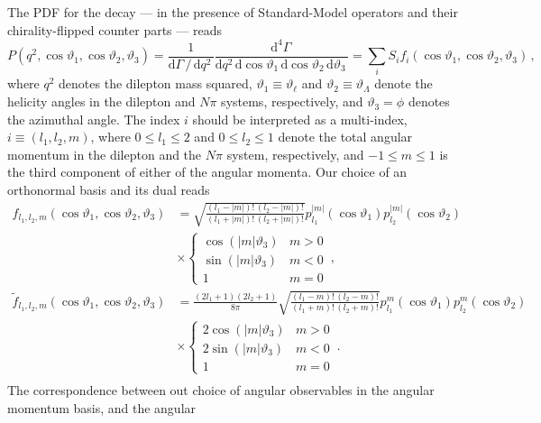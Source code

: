 \documentclass[aps,prd,reprint,nofootinbib,preprintnumbers]{revtex4}
\newcommand{\rmdx}[1]{\mbox{d} #1 \,} %
\renewcommand{\theta}{\vartheta}
\begin{document}
The PDF for the decay --- in the presence of Standard-Model operators and their chirality-flipped counter parts --- reads \cite{Boeer:2014xx}
\begin{equation}
    P(q^2, \cos\theta_1, \cos\theta_2, \theta_3) = \frac{1}{\rmdx{\Gamma} /\, \rmdx{q^2}} \frac{\rmdx{^4\Gamma}}{\rmdx{q^2} \rmdx{\cos\theta_1} \rmdx{\cos\theta_2} \rmdx{\theta_3}} = \sum_i S_i f_i(\cos\theta_1, \cos\theta_2, \theta_3)\,,
\end{equation}
where $q^2$ denotes the dilepton mass squared, $\theta_1 \equiv \theta_\ell$ and $\theta_2 \equiv \theta_\Lambda$ denote the
helicity angles in the dilepton and
$N\pi$ systems, respectively, and $\theta_3 = \phi$ denotes the azimuthal angle.
The index $i$ should be interpreted as a multi-index, $i \equiv (l_1, l_2, m)$,
where $0 \leq l_1 \leq 2$ and $0 \leq l_2 \leq 1$ denote the total angular momentum in the
dilepton and the $N\pi$ system, respectively, and $-1 \leq m \leq 1$
is the third component of either of the angular momenta.
Our choice of an orthonormal basis and its dual reads
\begin{equation}
\label{eq:lambdab:bases}
\begin{aligned}
    f_{l_1, l_2, m}(\cos\theta_1, \cos\theta_2, \theta_3)
    & = \sqrt{\frac{(l_1 - |m|)!\,(l_2 - |m|)!}{(l_1 + |m|)!\,(l_2 + |m|)!}} p_{l_1}^{|m|}(\cos\theta_1) p_{l_2}^{|m|}(\cos\theta_2)\\
    & \times \begin{cases}
            \cos(|m|\theta_3) & m > 0\\
            \sin(|m|\theta_3) & m < 0\\
            1                 & m = 0
        \end{cases}\,,\\
    \tilde{f}_{l_1, l_2, m}(\cos\theta_1, \cos\theta_2, \theta_3)
    & = \frac{(2l_1 + 1)(2l_2 + 1)}{8\pi}\sqrt{\frac{(l_1 - m)!\,(l_2 - m)!}{(l_1 + m)!\,(l_2 + m)!}} p_{l_1}^m(\cos\theta_1) p_{l_2}^m(\cos\theta_2)\\
    & \times \begin{cases}
            2 \cos(|m|\theta_3) & m > 0\\
            2 \sin(|m|\theta_3) & m < 0\\
            1                   & m = 0
        \end{cases}\,.\\
\end{aligned}
\end{equation}
The correspondence between out choice of angular observables in the angular momentum basis, and the angular
\end{document}
